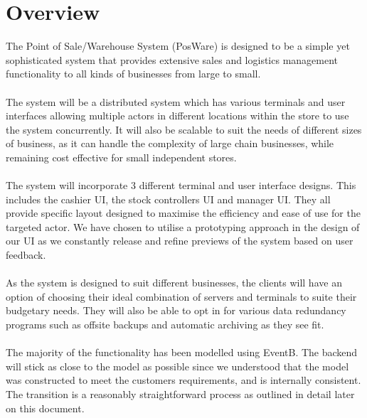 \documentclass[a4paper]{article}
\begin{document}
\pagebreak


\tableofcontents
\pagebreak


\setcounter{page}{1}     %
\renewcommand{\thepage}{\arabic{page}}  %


\section{Overview}
The Point of Sale/Warehouse System (PosWare) is designed to be a simple yet sophisticated system that provides extensive sales and logistics management functionality to all kinds of businesses from large to small. 
\\\\
The system will be a distributed system which has various terminals and user interfaces allowing multiple actors in different locations within the store to use the system concurrently. It will also be scalable to suit the needs of different sizes of business, as it can handle the complexity of large chain businesses, while remaining cost effective for small independent stores.
\\\\
The system will incorporate 3 different terminal and user interface designs. This includes the cashier UI, the stock controllers UI and manager UI. They all provide specific layout designed to maximise the efficiency and ease of use for the targeted actor. We have chosen to utilise a prototyping approach in the design of our UI as we constantly release and refine previews of the system based on user feedback. 
\\\\
As the system is designed to suit different businesses, the clients will have an option of choosing their ideal combination of servers and terminals to suite their budgetary needs. They will also be able to opt in for various data redundancy programs such as offsite backups and automatic archiving as they see fit.
\\\\
The majority of the functionality has been modelled using EventB. The backend will stick as close to the model as possible since we understood that the model was constructed to meet the customers requirements, and is internally consistent. The transition is a reasonably straightforward process as outlined in detail later on this document.
\end{document}
